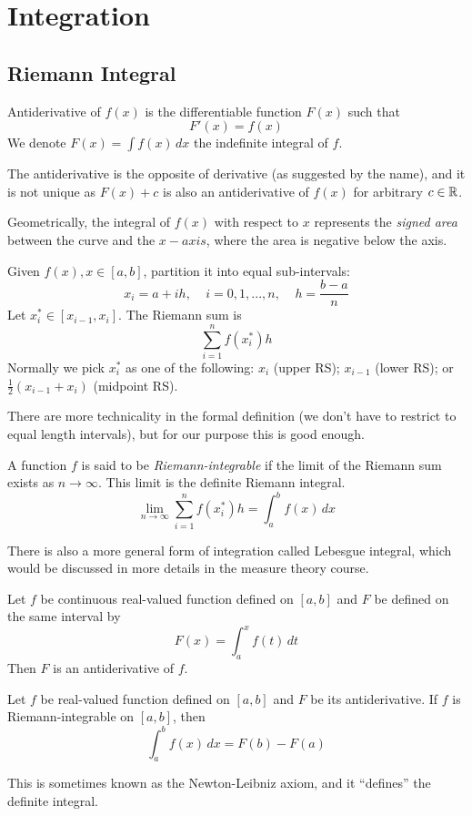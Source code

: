 \documentclass[11pt]{article}
\begin{document}
\section{Integration}
\subsection{Riemann Integral}
\begin{definition}[Antiderivative]
  Antiderivative of \(f(x)\) is the differentiable function \(F(x)\) such that \[F'(x)=f(x)\]
  We denote \(F(x)=\int f(x) \,dx\) the indefinite integral of \(f\).
\end{definition}
The antiderivative is the opposite of derivative (as suggested by the name), and it is not unique as \(F(x)+c\) is also an antiderivative of \(f(x)\) for arbitrary \(c\in\mathbb{R}\).

\vspace{5pt}Geometrically, the integral of \(f(x)\) with respect to \(x\) represents the \emph{signed area} between the curve and the \(x-axis\), where the area is negative below the axis.

\begin{definition}
  Given \(f(x), x\in [a,b]\), partition it into equal sub-intervals:
  \[x_i=a+ih, \:\:\:\:\: i=0,1,...,n, \:\:\:\:\: h=\frac{b-a}{n}\]
  Let \(x_i^* \in [x_{i-1},x_i]\). The Riemann sum is 
  \[\sum_{i=1}^n f(x_i^*)h\]
  Normally we pick \(x_i^*\) as one of the following: \(x_i\) (upper RS); \(x_{i-1}\) (lower RS); or \(\frac{1}{2}(x_{i-1}+x_i)\) (midpoint RS).
\end{definition}
There are more technicality in the formal definition (we don't have to restrict to equal length intervals), but for our purpose this is good enough. 
\begin{definition}
  A function \(f\) is said to be \emph{Riemann-integrable} if the limit of the Riemann sum exists as \(n\to\infty\). This limit is the definite Riemann integral.
  \[\lim_{n\to\infty}\sum_{i=1}^n f(x_i^*)h=\int_a^b f(x)\,dx\]
\end{definition}
There is also a more general form of integration called Lebesgue integral, which would be discussed in more details in the measure theory course.

\begin{theorem}
  Let \(f\) be continuous real-valued function defined on \([a,b]\) and \(F\) be defined on the same interval by
  \[F(x)=\int_a^xf(t)\,dt\]
  Then \(F\) is an antiderivative of \(f\).
\end{theorem}
\begin{theorem}
  Let \(f\) be real-valued function defined on \([a,b]\) and \(F\) be its antiderivative. If \(f\) is Riemann-integrable on \([a,b]\), then
  \[\int_a^bf(x)\,dx=F(b)-F(a)\]
\end{theorem}
This is sometimes known as the Newton-Leibniz axiom, and it ``defines'' the definite integral.
\end{document}
